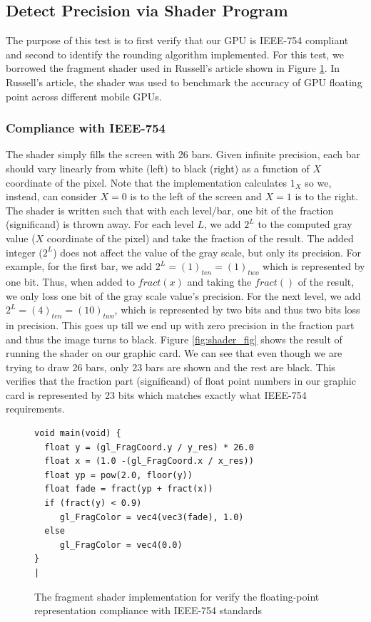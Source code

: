 \subsection{Detect Precision via Shader Program}
The purpose of this test is to first verify that our GPU is IEEE-754 compliant and second to identify the rounding algorithm implemented. For this test, we borrowed the fragment shader used in Russell's article \cite{stuart2013mobile} shown in Figure \ref{fig:shader_code}. In Russell's article, the shader was used to benchmark the accuracy of GPU floating point across different mobile GPUs. 

\subsubsection{Compliance with IEEE-754}
The shader simply fills the screen with 26 bars. Given infinite precision, each bar should vary linearly from white (left) to black (right) as a function of $X$ coordinate of the pixel. Note that the implementation calculates $1_X$ so we, instead, can consider $X=0$ is to the left of the screen and $X=1$ is to the right. The shader is written such that with each level/bar, one bit of the fraction (significand) is thrown away. For each level $L$, we add $2^{L}$ to the computed gray value ($X$ coordinate of the pixel) and take the fraction of the result. The added integer ($2^{L}$) does not affect the value of the gray scale, but only its precision. For example, for the first bar, we add  $2^{L}=(1)_{ten}=(1)_{two}$ which is represented by one bit. Thus, when added to $fract(x)$ and taking the $fract()$ of the result, we only loss one bit of the gray scale value's precision. For the next level, we add $2^{L}=(4)_{ten}=(10)_{two}$, which is represented by two bits and thus two bits loss in precision. This goes up till we end up with zero precision in the fraction part and thus the image turns to black. Figure \ref{fig:shader_fig} shows the result of running the shader on our graphic card. We can see that even though we are trying to draw 26 bars, only 23 bars are shown and the rest are black. This verifies that the fraction part (significand) of float point numbers in our graphic card is represented by 23 bits which matches exactly what IEEE-754 requirements. 

\begin{figure}[t!]
\centering
\begin{minipage}[t]{\textwidth}
\centering
\begin{lstlisting}[label=list:ExampleShader,
escapechar=|,
caption={
  Fragment Shader.
}]
void main(void) {
  float y = (gl_FragCoord.y / y_res) * 26.0
  float x = (1.0 -(gl_FragCoord.x / x_res))
  float yp = pow(2.0, floor(y))
  float fade = fract(yp + fract(x))
  if (fract(y) < 0.9)
     gl_FragColor = vec4(vec3(fade), 1.0)
  else
     gl_FragColor = vec4(0.0)
}
|
\end{lstlisting}
\end{minipage}

\caption{The fragment shader implementation for verify the floating-point representation compliance with IEEE-754 standards}
\label{fig:shader_code}
\end{figure}


